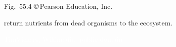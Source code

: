 \documentclass[t]{beamer}
\begin{document}
%
{
\begin{frame}[b]


	\hfill \tiny Fig.~55.4 \copyright\,Pearson Education, Inc.

\end{frame}
}
%
{
\begin{frame}[b]{ return nutrients from dead organisms to the ecosystem.}

	\hfill \tiny \textcolor{white}{TimVickers, Wikimedia, public domain}
\end{frame}
}
%
\end{document}
